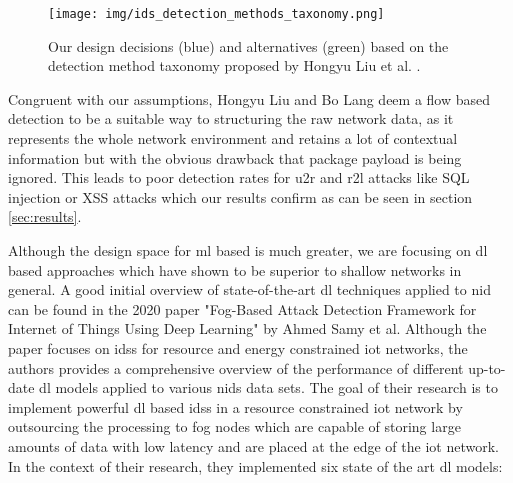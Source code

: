 \begin{figure}[H]
	\centering
	\texttt{[image: img/ids\_detection\_methods\_taxonomy.png]}
	\caption{Our design decisions (blue) and alternatives (green) based on the detection method taxonomy proposed by Hongyu Liu et al. \cite{nid_ml_survey_2019}.}
	\label{fig:stateofart:ids_detection_methods_taxonomy}
\end{figure}

Congruent with our assumptions, Hongyu Liu and Bo Lang deem a flow based detection to be a suitable way to structuring the raw network data, as it represents the whole network environment and retains a lot of contextual information but with the obvious drawback that package payload is being ignored. This leads to poor detection rates for \gls{u2r} and \gls{r2l} attacks like SQL injection or XSS attacks which our results confirm as can be seen in section \ref{sec:results}. \par

Although the design space for \gls{ml} based is much greater, we are focusing on \gls{dl} based approaches which have shown to be superior to shallow networks in general. A good initial overview of state-of-the-art \gls{dl} techniques applied to \gls{nid} can be found in the 2020 paper "Fog-Based Attack Detection Framework for Internet of Things Using Deep Learning" \cite{fog_based_detection_survey_2020} by Ahmed Samy et al. Although the paper focuses on \glspl{ids} for resource and energy constrained \gls{iot} networks, the authors provides a comprehensive overview of the performance of different up-to-date \gls{dl} models applied to various \gls{nids} data sets. The goal of their research is to implement powerful \gls{dl} based \glspl{ids} in a resource constrained \gls{iot} network by outsourcing the processing to fog nodes which are capable of storing large amounts of data with low latency and are placed at the edge of the \gls{iot} network. In the context of their research, they implemented six state of the art \gls{dl} models:


